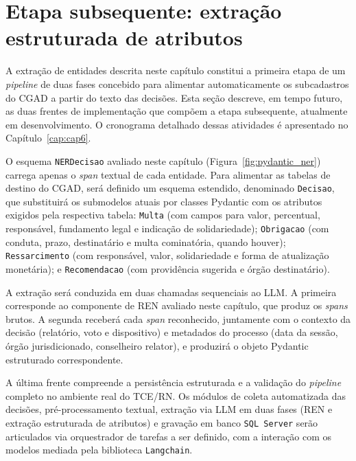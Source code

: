 \section{Etapa subsequente: extração estruturada de atributos}
\label{sec:integracao}

A extração de entidades descrita neste capítulo constitui a primeira etapa de um \textit{pipeline} de duas fases concebido para alimentar automaticamente os subcadastros do CGAD a partir do texto das decisões. Esta seção descreve, em tempo futuro, as duas frentes de implementação que compõem a etapa subsequente, atualmente em desenvolvimento. O cronograma detalhado dessas atividades é apresentado no Capítulo~\ref{cap:cap6}.

O esquema \texttt{NERDecisao} avaliado neste capítulo (Figura~\ref{fig:pydantic_ner}) carrega apenas o \textit{span} textual de cada entidade. Para alimentar as tabelas de destino do CGAD, será definido um esquema estendido, denominado \texttt{Decisao}, que substituirá os submodelos atuais por classes Pydantic com os atributos exigidos pela respectiva tabela: \texttt{Multa} (com campos para valor, percentual, responsável, fundamento legal e indicação de solidariedade); \texttt{Obrigacao} (com conduta, prazo, destinatário e multa cominatória, quando houver); \texttt{Ressarcimento} (com responsável, valor, solidariedade e forma de atualização monetária); e \texttt{Recomendacao} (com providência sugerida e órgão destinatário).

A extração será conduzida em duas chamadas sequenciais ao LLM. A primeira corresponde ao componente de REN avaliado neste capítulo, que produz os \textit{spans} brutos. A segunda receberá cada \textit{span} reconhecido, juntamente com o contexto da decisão (relatório, voto e dispositivo) e metadados do processo (data da sessão, órgão jurisdicionado, conselheiro relator), e produzirá o objeto Pydantic estruturado correspondente.

A última frente compreende a persistência estruturada e a validação do \textit{pipeline} completo no ambiente real do TCE/RN. Os módulos de coleta automatizada das decisões, pré-processamento textual, extração via LLM em duas fases (REN e extração estruturada de atributos) e gravação em banco \texttt{SQL Server} serão articulados via orquestrador de tarefas a ser definido, com a interação com os modelos mediada pela biblioteca \texttt{Langchain}.